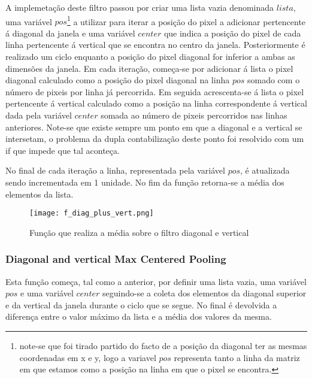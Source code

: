   A implemetação deste filtro passou por criar uma lista vazia denominada $lista$, uma variável $pos$\footnote{note-se que foi tirado partido do facto de a posição da diagonal ter as mesmas coordenadas em x e y, logo a variavel $pos$ representa tanto a linha da matriz em que estamos como a posição na linha em que o pixel se encontra.} a utilizar para iterar a posição do pixel a adicionar pertencente á diagonal da janela e uma variável $center$ que indica a posição do pixel de cada linha pertencente á vertical que se encontra no centro da janela.\newline
  Posteriormente é realizado um ciclo enquanto a posição do pixel diagonal for inferior a ambas as dimensões da janela. Em cada iteração, começa-se por adicionar á lista o pixel diagonal calculado como a posição do pixel diagonal na linha $pos$ somado com o número de pixeis por linha já percorrida. Em seguida acrescenta-se á lista o pixel pertencente á vertical calculado como a posição na linha correspondente á vertical dada pela variável $center$ somada ao número de pixeis percorridos nas linhas anteriores. Note-se que existe sempre um ponto em que a diagonal e a vertical se intersetam, o problema da dupla contabilização deste ponto foi resolvido com um if que impede que tal aconteça.\newline

   No final de cada iteração a linha, representada pela variável $pos$, é atualizada sendo incrementada em 1 unidade.\newline
  No fim da função retorna-se a média dos elementos da lista.

	\begin{figure}[H]

	  \centering
	  \captionsetup{justification=centering}

	  \texttt{[image: f\_diag\_plus\_vert.png]}
	  
	  \caption {Função que realiza a média sobre o filtro diagonal e vertical}
	\end{figure}


\subsubsection{Diagonal and vertical Max Centered Pooling}\hfill\newline
  \hfill\newline
  Esta função começa, tal como a anterior, por definir uma lista vazia, uma variável $pos$ e uma variável $center$ seguindo-se a coleta dos elementos da diagonal superior e da vertical da janela durante o ciclo que se segue. No final é devolvida a diferença entre o valor máximo da lista e a média dos valores da mesma.


